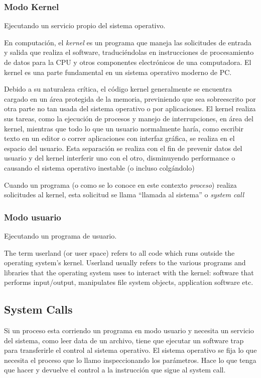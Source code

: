\documentclass[a4paper, twoside]{article}
\begin{document}
\subsubsection{Modo Kernel}

Ejecutando un servicio propio del sistema operativo.

En computación, el \emph{kernel} es un programa que maneja las solicitudes de
entrada y salida que realiza el software, traduciéndolas en instrucciones de
procesamiento de datos para la CPU y otros componentes electrónicos de una
computadora.
El kernel es una parte fundamental en un sistema operativo moderno de PC.

Debido a su naturaleza crítica, el código kernel generalmente se encuentra
cargado en un área protegida de la memoria, previniendo que sea sobreescrito
por otra parte no tan usada del sistema operativo o por aplicaciones.
El kernel realiza sus tareas, como la ejecución de procesos y manejo de
interrupciones, en área del kernel, mientras que todo lo que un usuario
normalmente haría, como escribir texto en un editor o correr aplicaciones con
interfaz gráfica, se realiza en el espacio del usuario.
Esta separación se realiza con el fin de prevenir datos del usuario y del
kernel interferir uno con el otro, disminuyendo performance o causando el
sistema operativo inestable (o incluso colgándolo)

Cuando un programa (o como se lo conoce en este contexto \emph{proceso})
realiza solicitudes al kernel, esta solicitud se llama ``llamada al sistema'' o
\emph{system call}

\subsubsection{Modo usuario}

Ejecutando un programa de usuario.

The term userland (or user space) refers to all code which runs outside the operating system's kernel. Userland usually refers to the various programs and libraries that the operating system uses to interact with the kernel: software that performs input/output, manipulates file system objects, application software etc.

\subsection{System Calls}
Si un proceso esta corriendo un programa en modo usuario y necesita un servicio del sistema, como leer data de un archivo, tiene que ejecutar un software trap para transferirle el control al sistema operativo. El sistema operativo se fija lo que necesita el proceso que lo llamo inspeccionando los parámetros. Hace lo que tenga que hacer y devuelve el control a la instrucción que sigue al system call.\\
\end{document}
